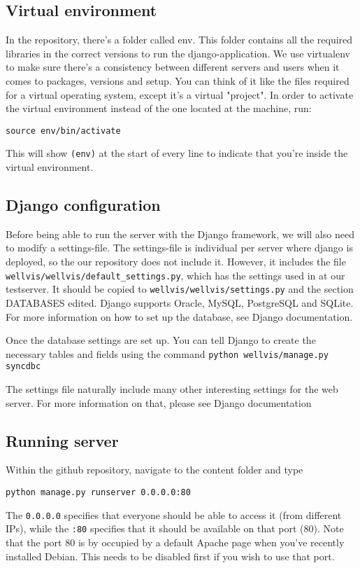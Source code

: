 \documentclass{report}
\begin{document}
\subsection{Virtual environment}
In the repository, there's a folder called env. This folder contains all the required libraries in the correct versions to run the django-application. We use virtualenv to make sure there's a consistency between different servers and users when it comes to packages, versions and setup. You can think of it like the files required for a virtual operating system, except it's a virtual "project".
In order to activate the virtual environment instead of the one located at the machine, run:
\begin{verbatim}
source env/bin/activate
\end{verbatim}
This will show \verb|(env)| at the start of every line to indicate that you're inside the virtual environment.
\subsection{Django configuration}
\par Before being able to run the server with the Django framework, we will also need to modify a settings-file. The settings-file is individual per server where django is deployed, so the our repository does not include it. However, it includes the file \verb|wellvis/wellvis/default_settings.py|, which has the settings used in at our testserver. It should be copied to \verb|wellvis/wellvis/settings.py| and the section DATABASES edited. Django supports Oracle, MySQL, PostgreSQL and SQLite. For more information on how to set up the database, see Django documentation\cite{website:django_install}.
\par Once the database settings are set up. You can tell Django to create the necessary tables and fields using the command \verb|python wellvis/manage.py syncdbc|
\par The settings file naturally include many other interesting settings for the web server. For more information on that, please see Django documentation\cite{website:django_settings}
\subsection{Running server}
Within the github repository, navigate to the content folder and type
\begin{verbatim}
python manage.py runserver 0.0.0.0:80
\end{verbatim}
The \verb|0.0.0.0| specifies that everyone should be able to access it (from different IPs), while the \verb|:80| specifies that it should be available on that port (80)\cite{website:django_runserver}. Note that the port 80 is by occupied by a default Apache page when you've recently installed Debian. This needs to be disabled first if you wish to use that port.
\end{document}
